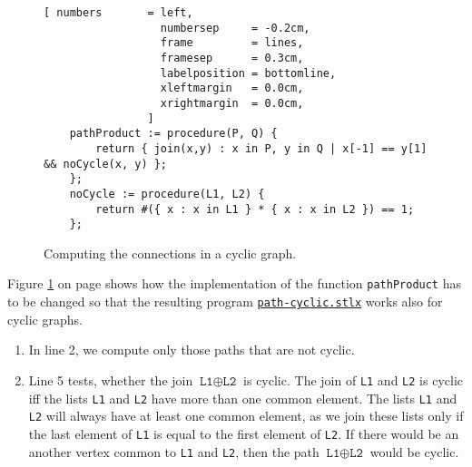 \begin{figure}[!ht]
  \centering
\begin{Verbatim}[ numbers       = left,
                  numbersep     = -0.2cm,
                  frame         = lines, 
                  framesep      = 0.3cm, 
                  labelposition = bottomline,
                  xleftmargin   = 0.0cm,
                  xrightmargin  = 0.0cm,
                ]
    pathProduct := procedure(P, Q) {
        return { join(x,y) : x in P, y in Q | x[-1] == y[1] && noCycle(x, y) };
    };
    noCycle := procedure(L1, L2) {
        return #({ x : x in L1 } * { x : x in L2 }) == 1;
    };
\end{Verbatim} 
\vspace*{-0.3cm}
\caption{Computing the connections in a cyclic graph.}  
\label{fig:path-cyclic.stlx}
\end{figure} %

Figure \ref{fig:path-cyclic.stlx} on page shows how the implementation of the function
\texttt{pathProduct} has to be changed so that the resulting program
\href{https://github.com/karlstroetmann/Logik/blob/master/SetlX/path-cyclic.stlx}{\texttt{path-cyclic.stlx}}
works also for cyclic graphs. 
\begin{enumerate}
\item In line 2, we compute only those paths that are not cyclic.
\item Line 5 tests, whether the join  $\texttt{L1} \oplus \texttt{L2}$ is cyclic.  The join
      of \texttt{L1} and \texttt{L2} is cyclic iff the lists \texttt{L1} and \texttt{L2} have more
      than one common element. 
      The lists \texttt{L1} and \texttt{L2} will always have at least one common element, as we join
      these lists only if the last element of \texttt{L1} is equal to the first element of  \texttt{L2}.
      If there would be an another vertex common to \texttt{L1} and \texttt{L2}, then the path
      $\texttt{L1} \oplus \texttt{L2}$ would be cyclic.
\end{enumerate}

